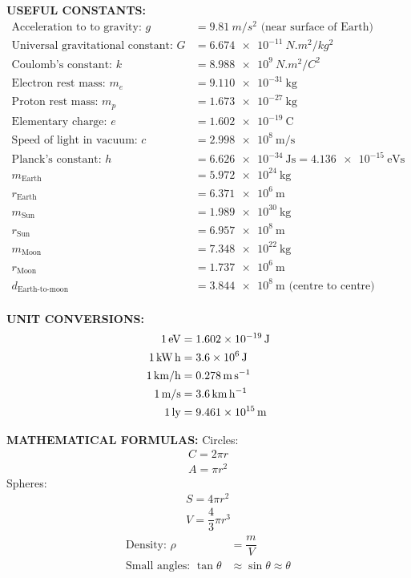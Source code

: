\documentclass[11pt]{article}
\begin{document}
\begin{multicols*}{3}
  \vspace{.2in}\textbf{USEFUL CONSTANTS:}
  \begin{align*}
    \text{Acceleration to to gravity: }g &=\SI{9.81}{m/s^2}
    \text{ (near surface of Earth)}\\
    \text{Universal gravitational constant: }G &=\SI{6.674e-11}{N.m^2/kg^2}\\
    \text{Coulomb's constant: }k &=\SI{8.988e9}{N.m^2/C^2}\\
    \text{Electron rest mass: }m_e &=\SI{9.110e-31}{\kilo\gram}\\
    \text{Proton rest mass: }m_p &=\SI{1.673e-27}{\kilo\gram}\\
    \text{Elementary charge: }e &=\SI{1.602e-19}\coulomb\\
    \text{Speed of light in vacuum: }c &=\SI{2.998e8}{\metre\per\second}\\
    \text{Planck's constant: }h &=\SI{6.626e-34}{\joule\second}
    =\SI{4.136e-15}{\electronvolt\second}\\
    m_\text{Earth} &=\SI{5.972e24}{\kilo\gram}\\
    r_\text{Earth} &=\SI{6.371e6}\metre\\
    m_\text{Sun} &=\SI{1.989e30}{\kilo\gram}\\
    r_\text{Sun} &=\SI{6.957e8}\metre\\
    m_\text{Moon} &=\SI{7.348e22}{\kilo\gram}\\
    r_\text{Moon} &=\SI{1.737e6}\metre\\
    d_\text{Earth-to-moon}&=\SI{3.844e8}\metre\text{ (centre to centre)}\\
  \end{align*}

  \textbf{UNIT CONVERSIONS:}
  \begin{align*}
    \SI1\electronvolt &=\SI{1.602e-19}\joule\\
    \SI1{\kilo\watt\hour} &=\SI{3.6e6}\joule\\
    \SI1{km/h} &=\SI{0.278}{\metre\per\second}\\
    \SI1{m/s} &=\SI{3.6}{\kilo\metre\per\hour}\\
    \SI1{ly} &=\SI{9.461e15}\metre
  \end{align*}

  \textbf{MATHEMATICAL FORMULAS:}
  Circles:
  \begin{align*}
    C=2\pi r\\
    A=\pi r^2
  \end{align*}
  Spheres:
  \begin{align*}
    S=4\pi r^2\\
    V=\dfrac43\pi r^3
  \end{align*}
  \begin{align*}
    \text{Density: }\rho &=\dfrac mV\\
    \text{Small angles: }\tan\theta &\approx\sin\theta\approx\theta
  \end{align*}
\end{multicols*}
\end{document}
